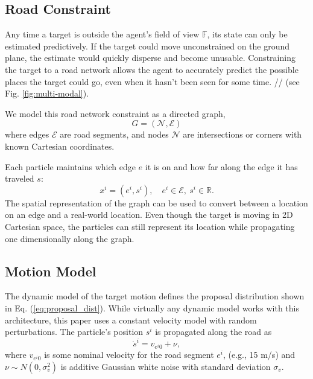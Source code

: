 \documentclass[letterpaper, 10 pt, conference]{ieeeconf}  %
\begin{document}
\subsection{Road Constraint}

Any time a target is outside the agent's field of view $\mathbb{F}$, its state can only be estimated predictively. If the target could move unconstrained on the ground plane, the estimate would quickly disperse and become unusable. Constraining the target to a road network allows the agent to accurately predict the possible places the target could go, even when it hasn't been seen for some time. // (see Fig. \ref{fig:multi-modal}).

We model this road network constraint as a directed graph,
\begin{equation}%
    G = (\mathcal{N}, \mathcal{E})
\end{equation}
where edges $\mathcal{E}$ are road segments, and nodes $\mathcal{N}$ are intersections or corners with known Cartesian coordinates.

Each particle maintains which edge $e$ it is on and how far along the edge it has traveled $s$:
\begin{equation}%
    x^i = (e^i, s^i), \quad e^i \in \mathcal{E},\ s^i \in \mathbb{R}.
\end{equation}
The spatial representation of the graph can be used to convert between a location on an edge and a real-world location. Even though the target is moving in 2D Cartesian space, the particles can still represent its location while propagating one dimensionally along the graph.

\subsection{Motion Model}

The dynamic model of the target motion defines the proposal distribution shown in Eq. (\ref{eq:proposal_dist}). While virtually any dynamic model works with this architecture, this paper uses a constant velocity model with random perturbations. The particle's position $s^i$ is propagated along the road as
\begin{equation}%
    \dot{s}^i = v_{e^{i}0} + \nu,
\end{equation}
where $v_{e^{i}0}$ is some nominal velocity for the road segment $e^i$, (e.g., 15 m/s) and $\nu \sim N(0, \sigma_v^2)$ is additive Gaussian white noise with standard deviation $\sigma_v$.
\end{document}
